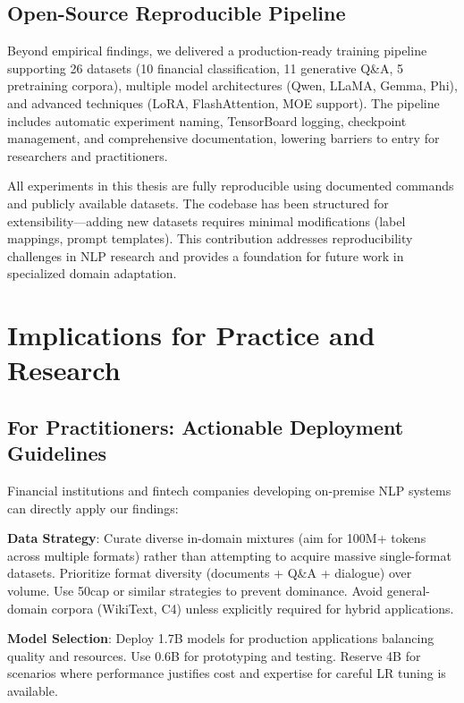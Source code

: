 \subsection{Open-Source Reproducible Pipeline}

Beyond empirical findings, we delivered a production-ready training pipeline supporting 26 datasets (10 financial classification, 11 generative Q\&A, 5 pretraining corpora), multiple model architectures (Qwen, LLaMA, Gemma, Phi), and advanced techniques (LoRA, FlashAttention, MOE support). The pipeline includes automatic experiment naming, TensorBoard logging, checkpoint management, and comprehensive documentation, lowering barriers to entry for researchers and practitioners.

All experiments in this thesis are fully reproducible using documented commands and publicly available datasets. The codebase has been structured for extensibility—adding new datasets requires minimal modifications (label mappings, prompt templates). This contribution addresses reproducibility challenges in NLP research and provides a foundation for future work in specialized domain adaptation.

\section{Implications for Practice and Research}

\subsection{For Practitioners: Actionable Deployment Guidelines}

Financial institutions and fintech companies developing on-premise NLP systems can directly apply our findings:

\textbf{Data Strategy}: Curate diverse in-domain mixtures (aim for 100M+ tokens across multiple formats) rather than attempting to acquire massive single-format datasets. Prioritize format diversity (documents + Q\&A + dialogue) over volume. Use 50cap or similar strategies to prevent dominance. Avoid general-domain corpora (WikiText, C4) unless explicitly required for hybrid applications.

\textbf{Model Selection}: Deploy 1.7B models for production applications balancing quality and resources. Use 0.6B for prototyping and testing. Reserve 4B for scenarios where performance justifies cost and expertise for careful LR tuning is available.

